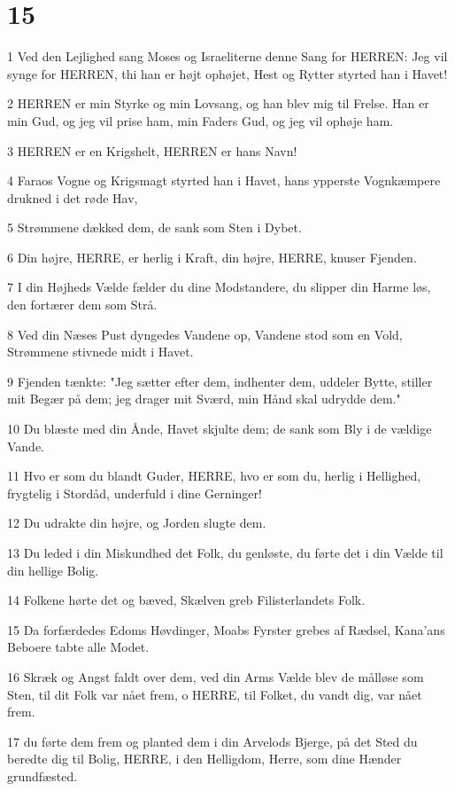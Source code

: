 \chapter{15}

\par 1 Ved den Lejlighed sang Moses og Israeliterne denne Sang for HERREN: Jeg vil synge for HERREN, thi han er højt ophøjet, Hest og Rytter styrted han i Havet!
\par 2 HERREN er min Styrke og min Lovsang, og han blev mig til Frelse. Han er min Gud, og jeg vil prise ham, min Faders Gud, og jeg vil ophøje ham.
\par 3 HERREN er en Krigshelt, HERREN er hans Navn!
\par 4 Faraos Vogne og Krigsmagt styrted han i Havet, hans ypperste Vognkæmpere drukned i det røde Hav,
\par 5 Strømmene dækked dem, de sank som Sten i Dybet.
\par 6 Din højre, HERRE, er herlig i Kraft, din højre, HERRE, knuser Fjenden.
\par 7 I din Højheds Vælde fælder du dine Modstandere, du slipper din Harme løs, den fortærer dem som Strå.
\par 8 Ved din Næses Pust dyngedes Vandene op, Vandene stod som en Vold, Strømmene stivnede midt i Havet.
\par 9 Fjenden tænkte: "Jeg sætter efter dem, indhenter dem, uddeler Bytte, stiller mit Begær på dem; jeg drager mit Sværd, min Hånd skal udrydde dem."
\par 10 Du blæste med din Ånde, Havet skjulte dem; de sank som Bly i de vældige Vande.
\par 11 Hvo er som du blandt Guder, HERRE, hvo er som du, herlig i Hellighed, frygtelig i Stordåd, underfuld i dine Gerninger!
\par 12 Du udrakte din højre, og Jorden slugte dem.
\par 13 Du leded i din Miskundhed det Folk, du genløste, du førte det i din Vælde til din hellige Bolig.
\par 14 Folkene hørte det og bæved, Skælven greb Filisterlandets Folk.
\par 15 Da forfærdedes Edoms Høvdinger, Moabs Fyrster grebes af Rædsel, Kana'ans Beboere tabte alle Modet.
\par 16 Skræk og Angst faldt over dem, ved din Arms Vælde blev de målløse som Sten, til dit Folk var nået frem, o HERRE, til Folket, du vandt dig, var nået frem.
\par 17 du førte dem frem og planted dem i din Arvelods Bjerge, på det Sted du beredte dig til Bolig, HERRE, i den Helligdom, Herre, som dine Hænder grundfæsted.
